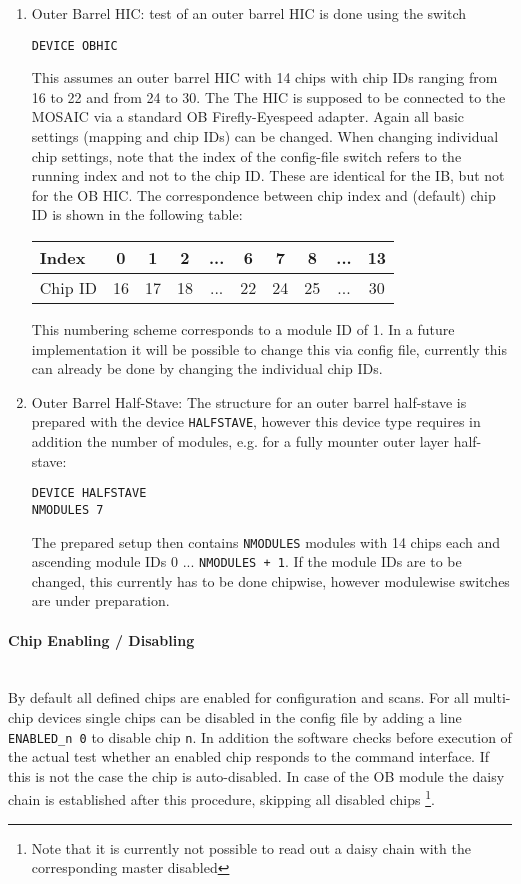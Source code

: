 \documentclass{article}
\begin{document}
\begin {enumerate}
\item Outer Barrel HIC: test of an outer barrel HIC is done using the switch
\begin{verbatim} 
DEVICE OBHIC
\end{verbatim}
This assumes an outer barrel HIC with 14 chips with chip IDs ranging from 16 to 22 and from 24 to 30. The The HIC is supposed to be connected to the MOSAIC via a standard OB Firefly-Eyespeed adapter. Again all basic settings (mapping and chip IDs) can be changed. When changing individual chip settings, note that the index of the config-file switch refers to the running index and not to the chip ID. These are identical for the IB, but not for the OB HIC. The correspondence between chip index and (default) chip ID is shown in the following table:
\begin{center}
\begin{tabular}{|l|c|c|c|c|c|c|c|c|c|}\hline
Index & 0 & 1 & 2 & ... & 6 & 7 & 8 & ... & 13\\ \hline
Chip ID & 16 & 17 & 18 & ... & 22 & 24 & 25 & ... & 30\\ \hline
\end{tabular}
\end{center}
This numbering scheme corresponds to a module ID of 1. In a future implementation it will be possible to change this via config file, currently this can already be done by changing the individual chip IDs.

\item Outer Barrel Half-Stave: The structure for an outer barrel half-stave is prepared with the device \texttt{HALFSTAVE}, however this device type requires in addition the number of modules, e.g. for a fully mounter outer layer half-stave:
\begin{verbatim}
DEVICE HALFSTAVE
NMODULES 7
\end{verbatim}
The prepared setup then contains \texttt{NMODULES} modules with 14 chips each and ascending module IDs 0 ... \texttt{NMODULES + 1}. If the module IDs are to be changed, this currently has to be done chipwise, however modulewise switches are under preparation.

\end{enumerate}



\paragraph {Chip Enabling / Disabling} \hfill \\
By default all defined chips are enabled for configuration and scans. For all multi-chip devices single chips can be disabled in the config file by adding a line \texttt{ENABLED\_n 0} to disable chip \texttt{n}. In addition the software checks before execution of the actual test whether an enabled chip responds to the command interface. If this is not the case the chip is auto-disabled. In case of the OB module the daisy chain is established after this procedure, skipping all disabled chips \footnote{Note that it is currently not possible to read out a daisy chain with the corresponding master disabled}.
\end{document}
